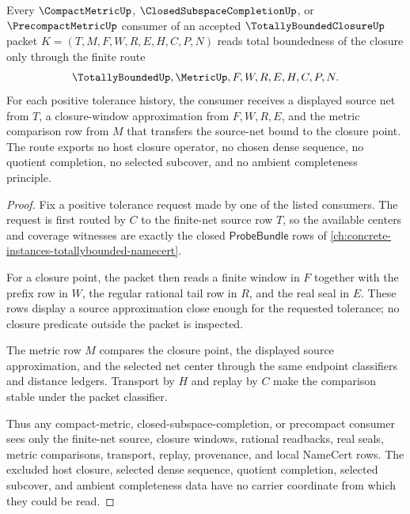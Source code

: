 \begin{theorem}
\label{thm:totally-bounded-closure-finite-net-closure-handoff}
Every $\CompactMetricUp$, $\ClosedSubspaceCompletionUp$, or $\PrecompactMetricUp$ consumer of an accepted $\TotallyBoundedClosureUp$ packet $K=(T,M,F,W,R,E,H,C,P,N)$ reads total boundedness of the closure only through the finite route
$$
\TotallyBoundedUp,\MetricUp,F,W,R,E,H,C,P,N .
$$
For each positive tolerance history, the consumer receives a displayed source net from $T$, a closure-window approximation from $F,W,R,E$, and the metric comparison row from $M$ that transfers the source-net bound to the closure point. The route exports no host closure operator, no chosen dense sequence, no quotient completion, no selected subcover, and no ambient completeness principle.
\end{theorem}
\begin{proof}
Fix a positive tolerance request made by one of the listed consumers. The request is first routed by $C$ to the finite-net source row $T$, so the available centers and coverage witnesses are exactly the closed $\mathsf{ProbeBundle}$ rows of \autoref{ch:concrete-instances-totallybounded-namecert}.

For a closure point, the packet then reads a finite window in $F$ together with the prefix row in $W$, the regular rational tail row in $R$, and the real seal in $E$. These rows display a source approximation close enough for the requested tolerance; no closure predicate outside the packet is inspected.

The metric row $M$ compares the closure point, the displayed source approximation, and the selected net center through the same endpoint classifiers and distance ledgers. Transport by $H$ and replay by $C$ make the comparison stable under the packet classifier.

Thus any compact-metric, closed-subspace-completion, or precompact consumer sees only the finite-net source, closure windows, rational readbacks, real seals, metric comparisons, transport, replay, provenance, and local NameCert rows. The excluded host closure, selected dense sequence, quotient completion, selected subcover, and ambient completeness data have no carrier coordinate from which they could be read.
\end{proof}

